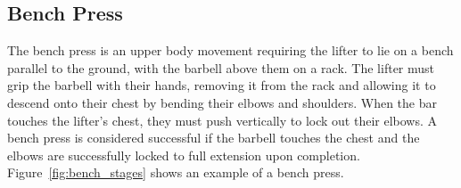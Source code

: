 \subsection{Bench Press}

The bench press is an upper body movement requiring the lifter to lie on a bench parallel to the ground, with the barbell above them on a rack. The lifter must grip the barbell with their hands, removing it from the rack and allowing it to descend onto their chest by bending their elbows and shoulders. When the bar touches the lifter's chest, they must push vertically to lock out their elbows. A bench press is considered successful if the barbell touches the chest and the elbows are successfully locked to full extension upon completion. Figure~\ref{fig:bench_stages} shows an example of a bench press.

